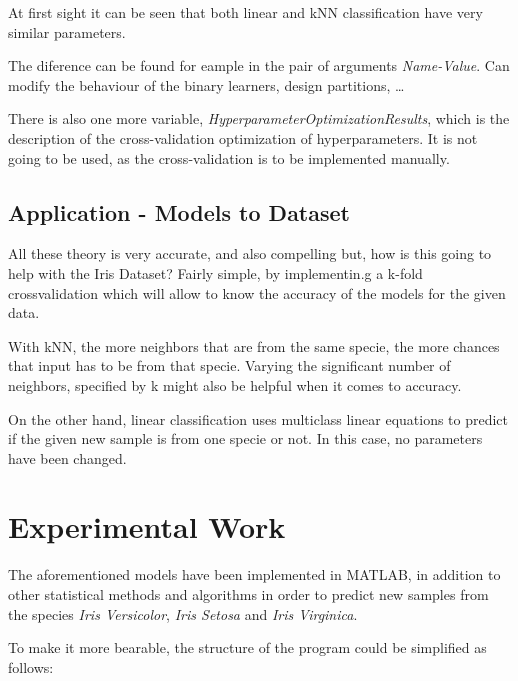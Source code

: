 \documentclass[11pt]{article}
\begin{document}
At first sight it can be seen that both linear and kNN classification have very
similar parameters.

The diference can be found for eample in the pair of arguments
\textit{Name-Value}. Can modify the behaviour of the binary learners, design
partitions, \ldots

There is also one more variable, \textit{HyperparameterOptimizationResults},
which is the description of the cross-validation optimization of
hyperparameters. It is not going to be used, as the cross-validation is to be
implemented manually.

\subsection{Application - Models to Dataset}

All these theory is very accurate, and also compelling but, how is this going to
help with the Iris Dataset? Fairly simple, by implementin.g a k-fold
crossvalidation which will allow to know the accuracy of the models for the
given data.

With kNN, the more neighbors that are from the same specie, the more chances
that input has to be from that specie. Varying the significant number of
neighbors, specified by k might also be helpful when it comes to accuracy.

On the other hand, linear classification uses multiclass linear equations to
predict if the given new sample is from one specie or not. In this case, no
parameters have been changed.

\section{Experimental Work}

The aforementioned models have been implemented in MATLAB, in addition to other
statistical methods and algorithms in order to predict new samples from the
species \textit{Iris Versicolor}, \textit{Iris Setosa} and \textit{Iris
Virginica}.

To make it more bearable, the structure of the program could be simplified as
follows:
\end{document}
